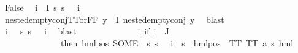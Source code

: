 \begin{isabellebody}
\ False\ \isamarkupfalse%
\ {\isachardoublequoteopen}{\isasymforall}i\ {\isasymin}\ I{\isachardot}{\kern0pt}\ {\isacharparenleft}{\kern0pt}{\isasymforall}s{\isachardot}{\kern0pt}\ {\isacharparenleft}{\kern0pt}s\ {\isasymTurnstile}\ {\isacharparenleft}{\kern0pt}{\isasymPhi}\ i{\isacharparenright}{\kern0pt}{\isacharparenright}{\kern0pt}{\isacharparenright}{\kern0pt}{\isachardoublequoteclose}\isanewline
\ \ \ \ \ \ \ \ \isamarkupfalse%
\ nested{\isacharunderscore}{\kern0pt}empty{\isacharunderscore}{\kern0pt}conj{\isacharunderscore}{\kern0pt}TT{\isacharunderscore}{\kern0pt}or{\isacharunderscore}{\kern0pt}FF\ {\isacartoucheopen}{\isasymforall}y{\isasymin}{\isasymPhi}\ {\isacharbackquote}{\kern0pt}\ I{\isachardot}{\kern0pt}\ nested{\isacharunderscore}{\kern0pt}empty{\isacharunderscore}{\kern0pt}conj\ y{\isacartoucheclose}\ \isamarkupfalse%
\ blast\ \isanewline
\ \ \ \ \ \ \ \ \isamarkupfalse%
\ {\isachardoublequoteopen}{\isasymforall}i\ {\isasymin}\ {\isacharbraceleft}{\kern0pt}{\isacharbraceright}{\kern0pt}{\isachardot}{\kern0pt}\ {\isacharparenleft}{\kern0pt}{\isasymforall}s{\isachardot}{\kern0pt}\ {\isacharparenleft}{\kern0pt}s\ {\isasymTurnstile}\ {\isacharparenleft}{\kern0pt}{\isasymPhi}\ i{\isacharparenright}{\kern0pt}{\isacharparenright}{\kern0pt}{\isacharparenright}{\kern0pt}{\isachardoublequoteclose}\ \isamarkupfalse%
\ blast\isanewline
\ \ \ \ \ \ \ \ \isamarkupfalse%
\ {\isasymPsi}\ \ {\isachardoublequoteopen}{\isasymPsi}\ {\isasymequiv}\ {\isacharparenleft}{\kern0pt}{\isasymlambda}i{\isachardot}{\kern0pt}\ {\isacharparenleft}{\kern0pt}if\ i\ {\isasymin}\ J\ \isanewline
\ \ \ \ \ \ \ \ \ \ \ \ \ \ then\ {\isacharparenleft}{\kern0pt}hml{\isacharunderscore}{\kern0pt}pos\ {\isacharparenleft}{\kern0pt}SOME\ {\isasymalpha}{\isachardot}{\kern0pt}\ {\isacharparenleft}{\kern0pt}{\isasymforall}s{\isachardot}{\kern0pt}\ {\isacharparenleft}{\kern0pt}s\ {\isasymTurnstile}\ {\isacharparenleft}{\kern0pt}{\isasymPhi}\ i{\isacharparenright}{\kern0pt}{\isacharparenright}{\kern0pt}\ {\isasymlongleftrightarrow}\ {\isacharparenleft}{\kern0pt}s\ {\isasymTurnstile}\ {\isacharparenleft}{\kern0pt}hml{\isacharunderscore}{\kern0pt}pos\ {\isasymalpha}\ TT{\isacharparenright}{\kern0pt}{\isacharparenright}{\kern0pt}{\isacharparenright}{\kern0pt}{\isacharparenright}{\kern0pt}\ TT{\isacharcolon}{\kern0pt}{\isacharcolon}{\kern0pt}\ {\isacharparenleft}{\kern0pt}{\isacharprime}{\kern0pt}a{\isacharcomma}{\kern0pt}\ {\isacharprime}{\kern0pt}s{\isacharparenright}{\kern0pt}\ hml{\isacharparenright}{\kern0pt}\ \isanewline

\end{isabellebody}
